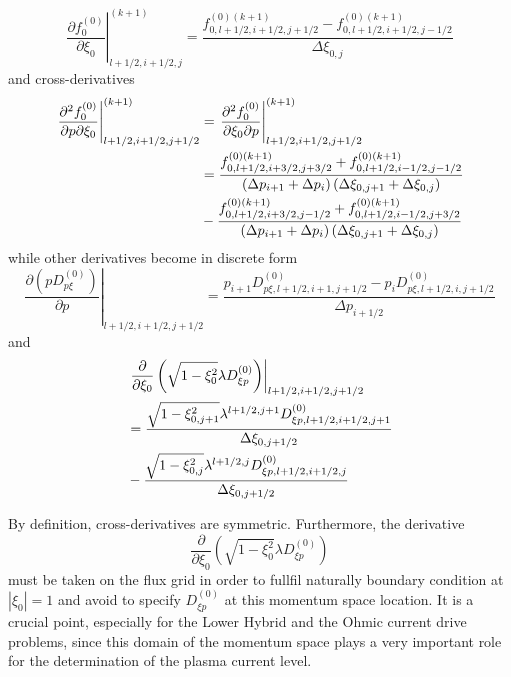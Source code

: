 \begin{equation}
\left. \frac{\partial f_{0}^{\left( 0\right) }}{\partial\xi_{0}}\right|
_{l+1/2,i+1/2,j}^{(k+1)}=\frac{f_{0,l+1/2,i+1/2,j+1/2}^{\left( 0\right)
(k+1)}-f_{0,l+1/2,i+1/2,j-1/2}^{\left( 0\right) (k+1)}}{\Delta\xi_{0,j}}
\label{dfdxi_ijm}
\end{equation}
and cross-derivatives 
\begin{align}
\left. \frac{\partial^{2}f_{0}^{\left( 0\right) }}{\partial p\partial \xi_{0}%
}\right| _{l+1/2,i+1/2,j+1/2}^{(k+1)} & =\left. \frac{\partial
^{2}f_{0}^{\left( 0\right) }}{\partial\xi_{0}\partial p}\right|
_{l+1/2,i+1/2,j+1/2}^{(k+1)}  \notag \\
& =\frac{f_{0,l+1/2,i+3/2,j+3/2}^{\left( 0\right)
(k+1)}+f_{0,l+1/2,i-1/2,j-1/2}^{\left( 0\right) (k+1)}}{\left( \Delta
p_{i+1}+\Delta p_{i}\right) \left( \Delta\xi_{0,j+1}+\Delta\xi_{0,j}\right) }
\notag \\
& -\frac{f_{0,l+1/2,i+3/2,j-1/2}^{\left( 0\right)
(k+1)}+f_{0,l+1/2,i-1/2,j+3/2}^{\left( 0\right) (k+1)}}{\left( \Delta
p_{i+1}+\Delta p_{i}\right) \left( \Delta\xi_{0,j+1}+\Delta\xi_{0,j}\right) }
\end{align}
while other derivatives become in discrete form 
\begin{equation}
\left. \frac{\partial\left( pD_{p\xi}^{\left( 0\right) }\right) }{\partial p}%
\right| _{l+1/2,i+1/2,j+1/2}=\frac{p_{i+1}D_{p\xi ,l+1/2,i+1,j+1/2}^{\left(
0\right) }-p_{i}D_{p\xi,l+1/2,i,j+1/2}^{\left( 0\right) }}{\Delta p_{i+1/2}}
\end{equation}
and 
\begin{align}
& \left. \frac{\partial}{\partial\xi_{0}}\left( \sqrt{1-\xi_{0}^{2}}\lambda
D_{\xi p}^{\left( 0\right) }\right) \right| _{l+1/2,i+1/2,j+1/2}  \notag \\
& =\frac{\sqrt{1-\xi_{0,j+1}^{2}}\lambda^{l+1/2,j+1}D_{\xi
p,l+1/2,i+1/2,j+1}^{\left( 0\right) }}{\Delta\xi_{0,j+1/2}}  \notag \\
& -\frac{\sqrt{1-\xi_{0,j}^{2}}\lambda^{l+1/2,j}D_{\xi
p,l+1/2,i+1/2,j}^{\left( 0\right) }}{\Delta\xi_{0,j+1/2}}
\end{align}

By definition, cross-derivatives are symmetric. Furthermore, the derivative 
\begin{equation}
\frac{\partial}{\partial\xi_{0}}\left( \sqrt{1-\xi_{0}^{2}}\lambda D_{\xi
p}^{\left( 0\right) }\right)
\end{equation}
must be taken on the flux grid in order to fullfil naturally boundary
condition at $\left| \xi_{0}\right| =1$ and avoid to specify $D_{\xi
p}^{\left( 0\right) }$ at this momentum space location. It is a crucial
point, especially for the Lower Hybrid and the Ohmic current drive problems,
since this domain of the momentum space plays a very important role for the
determination of the plasma current level.

